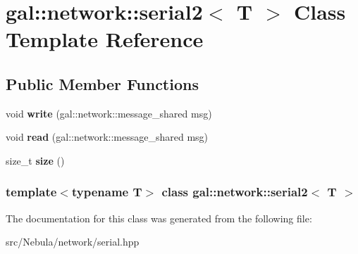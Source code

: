\hypertarget{classgal_1_1network_1_1serial2}{\section{gal\-:\-:network\-:\-:serial2$<$ \-T $>$ \-Class \-Template \-Reference}
\label{classgal_1_1network_1_1serial2}
}
\subsection*{\-Public \-Member \-Functions}
\begin{DoxyCompactItemize}
\item 
\hypertarget{classgal_1_1network_1_1serial2_afb7c93f57726c3dd3ec0332134bcd9b2}{void {\bfseries write} (gal\-::network\-::message\-\_\-shared msg)}\label{classgal_1_1network_1_1serial2_afb7c93f57726c3dd3ec0332134bcd9b2}

\item 
\hypertarget{classgal_1_1network_1_1serial2_ad1dd2750aa53ca2294b34a7f04a5cef7}{void {\bfseries read} (gal\-::network\-::message\-\_\-shared msg)}\label{classgal_1_1network_1_1serial2_ad1dd2750aa53ca2294b34a7f04a5cef7}

\item 
\hypertarget{classgal_1_1network_1_1serial2_adb6e73cdcbc1f67f71eaed2bdbeab6bb}{size\-\_\-t {\bfseries size} ()}\label{classgal_1_1network_1_1serial2_adb6e73cdcbc1f67f71eaed2bdbeab6bb}

\end{DoxyCompactItemize}
\subsubsection*{template$<$typename T$>$ class gal\-::network\-::serial2$<$ T $>$}



\-The documentation for this class was generated from the following file\-:\begin{DoxyCompactItemize}
\item 
src/\-Nebula/network/serial.\-hpp\end{DoxyCompactItemize}
